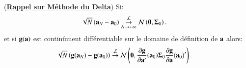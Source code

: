 \begin{enumerate}
\begin{enumerate}
    \begin{remarque}(\textbf{\underline{Rappel sur Méthode du Delta}})
        Si:
        \begin{align*}
            \sqrt{N}\left({\mathbf a}_N - {\mathbf a}_0\right)&\underset{N\rightarrow+\infty}{\overset{\mathcal{L}}{\rightarrow}} \mathcal{N}\left({\mathbf 0}, {\boldsymbol \Sigma}_0\right).
        \end{align*}
        et si ${\mathbf g}({\mathbf a})$ est continûment différentiable sur le domaine de définition de ${\mathbf a}$ alors:
\begin{align*}
    \sqrt{N}\left({\mathbf g}({\mathbf a}_N)-{\mathbf g}({\mathbf a}_0)\right)&\overset{\mathcal{L}}{\rightarrow}
     \mathcal{N}\left({\mathbf 0}, 
    \frac{\partial \bold g}{\partial {\mathbf a}^\prime}({\mathbf a}_0){\boldsymbol \Sigma}_0 \frac{\partial \bold g}{\partial {\mathbf a}}({\mathbf a}_0)^\prime\right).
\end{align*}
    \end{remarque}
\end{enumerate}
\end{enumerate}


 
